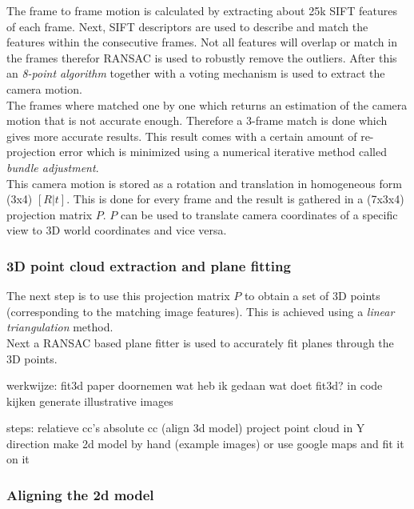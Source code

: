 The frame to frame motion is calculated by extracting about 25k SIFT features of each frame.  
Next, SIFT descriptors are used to describe and match the features within the consecutive
frames.  
Not all features will overlap or match in the frames therefor RANSAC is used to
robustly remove the outliers.  After this an \emph{8-point algorithm} together with a
voting mechanism is used to extract the camera motion.\\

The frames where matched one by one which returns an estimation of the camera
motion that is not accurate enough.  Therefore a 3-frame match is done which
gives more accurate results.  This result comes with a certain
amount of re-projection error which is minimized using a numerical
iterative method called \emph{bundle adjustment}.  \\

This camera motion is stored as a rotation and translation in homogeneous
form (3x4) $[R|t]$. This is done for every frame and the result is gathered in 
a (7x3x4) projection matrix $P$.
$P$ can be used to translate camera coordinates of a specific view 
 to 3D world coordinates and vice versa.

\subsubsection{3D point cloud extraction and plane fitting}
The next step is to use this projection matrix $P$ to obtain a set of 3D points
(corresponding to the matching image features).  This is achieved using a
\emph{linear triangulation} method. \\

Next a RANSAC based plane fitter is used to accurately fit planes through
the 3D points. 




werkwijze:
fit3d paper doornemen
wat heb ik gedaan wat doet fit3d?
	in code kijken
generate illustrative images


steps:
relatieve cc's
absolute cc (align 3d model)
	project point cloud in Y direction
	make 2d model by hand  (example images)
		or use google maps and fit it on it




\subsubsection{Aligning the 2d model}



